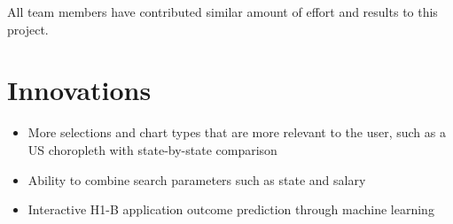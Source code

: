 \documentclass[sigconf]{acmart}
\begin{document}
All team members have contributed similar amount of effort and results to this project.

\section{Innovations}
\begin{itemize}
	\item More selections and chart types that are more relevant to the user, such as a US choropleth with state-by-state comparison
	\item Ability to combine search parameters such as state and salary
	\item Interactive H1-B application outcome prediction through machine learning

\end{itemize}
\end{document}
